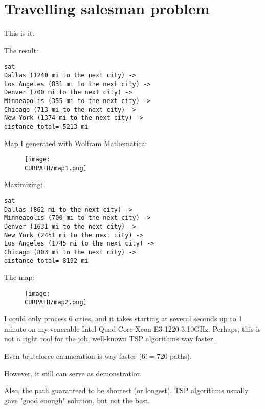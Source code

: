 \section{Travelling salesman problem}

\renewcommand{\CURPATH}{MaxSMT/TSP}

This is it:



The result:

\begin{lstlisting}
sat
Dallas (1240 mi to the next city) ->
Los Angeles (831 mi to the next city) ->
Denver (700 mi to the next city) ->
Minneapolis (355 mi to the next city) ->
Chicago (713 mi to the next city) ->
New York (1374 mi to the next city) ->
distance_total= 5213 mi
\end{lstlisting}

Map I generated with Wolfram Mathematica:

\begin{figure}[H]
\centering
\texttt{[image: \\CURPATH/map1.png]}
\caption{}
\end{figure}

Maximizing:

\begin{lstlisting}
sat
Dallas (862 mi to the next city) ->
Minneapolis (700 mi to the next city) ->
Denver (1631 mi to the next city) ->
New York (2451 mi to the next city) ->
Los Angeles (1745 mi to the next city) ->
Chicago (803 mi to the next city) ->
distance_total= 8192 mi
\end{lstlisting}

The map:

\begin{figure}[H]
\centering
\texttt{[image: \\CURPATH/map2.png]}
\caption{}
\end{figure}

I could only process 6 cities, and it takes starting at several seconds up to 1 minute on my venerable Intel Quad-Core Xeon E3-1220 3.10GHz.
Perhaps, this is not a right tool for the job, well-known TSP algorithms way faster.

Even bruteforce enumeration is way faster ($6!=720$ paths).

However, it still can serve as demonstration.

Also, the path guaranteed to be shortest (or longest).
TSP algorithms usually gave "good enough" solution, but not the best.

